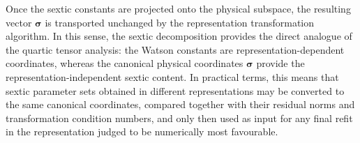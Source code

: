 Once the sextic constants are projected onto the physical subspace, the
resulting vector $\boldsymbol\sigma$ is transported unchanged by the
representation transformation algorithm.  In this sense, the sextic
decomposition provides the direct analogue of the quartic tensor analysis:
the Watson constants are representation-dependent coordinates, whereas the
canonical physical coordinates $\boldsymbol\sigma$ provide the
representation-independent sextic content.  In practical terms, this means
that sextic parameter sets obtained in different representations may be
converted to the same canonical coordinates, compared together with their
residual norms and transformation condition numbers, and only then used as
input for any final refit in the representation judged to be numerically most
favourable.
